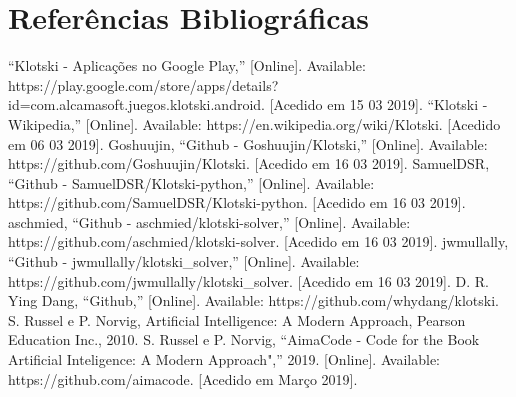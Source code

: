 \documentclass[conference]{IEEEtran}
\begin{document}
\section*{Referências Bibliográficas}



\begin{thebibliography}{00}
 “Klotski - Aplicações no Google Play,” [Online]. Available: https://play.google.com/store/apps/details?id=com.alcamasoft.juegos.klotski.android. [Acedido em 15 03 2019].
 “Klotski - Wikipedia,” [Online]. Available: https://en.wikipedia.org/wiki/Klotski. [Acedido em 06 03 2019].
 Goshuujin, “Github - Goshuujin/Klotski,” [Online]. Available: https://github.com/Goshuujin/Klotski. [Acedido em 16 03 2019].
 SamuelDSR, “Github - SamuelDSR/Klotski-python,” [Online]. Available: https://github.com/SamuelDSR/Klotski-python. [Acedido em 16 03 2019].
 aschmied, “Github - aschmied/klotski-solver,” [Online]. Available: https://github.com/aschmied/klotski-solver. [Acedido em 16 03 2019].
 jwmullally, “Github - jwmullally/klotski\_solver,” [Online]. Available: https://github.com/jwmullally/klotski\_solver. [Acedido em 16 03 2019].
 D. R. Ying Dang, “Github,” [Online]. Available: https://github.com/whydang/klotski.
  S. Russel e P. Norvig, Artificial Intelligence: A Modern Approach, Pearson Education Inc., 2010.
 S. Russel e P. Norvig, “AimaCode - Code for the Book Artificial Inteligence: A Modern Approach",” 2019. [Online]. Available: https://github.com/aimacode. [Acedido em Março 2019].


\end{thebibliography}
\vspace{12pt}
\color{red}
\end{document}
